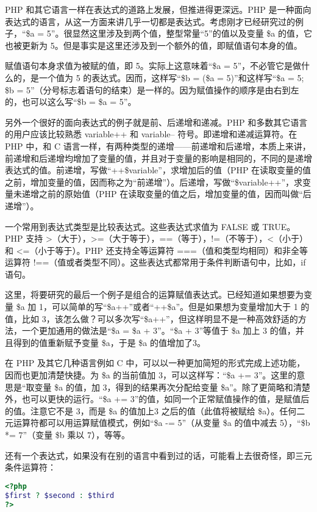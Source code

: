 PHP 和其它语言一样在表达式的道路上发展，但推进得更深远。PHP 是一种面向表达式的语言，从这一方面来讲几乎一切都是表达式。考虑刚才已经研究过的例子，“\$a = 5”。很显然这里涉及到两个值，整型常量“5”的值以及变量 \$a 的值，它也被更新为 5。但是事实是这里还涉及到一个额外的值，即赋值语句本身的值。

赋值语句本身求值为被赋的值，即 5。实际上这意味着“\$a = 5”，不必管它是做什么的，是一个值为 5 的表达式。因而，这样写“\$b = (\$a = 5)”和这样写“\$a = 5; \$b = 5”（分号标志着语句的结束）是一样的。因为赋值操作的顺序是由右到左的，也可以这么写“\$b = \$a = 5”。

另外一个很好的面向表达式的例子就是前、后递增和递减。PHP 和多数其它语言的用户应该比较熟悉 variable++ 和 variable-- 符号。即递增和递减运算符。在 PHP 中，和 C 语言一样，有两种类型的递增——前递增和后递增，本质上来讲，前递增和后递增均增加了变量的值，并且对于变量的影响是相同的，不同的是递增表达式的值。前递增，写做“++\$variable”，求增加后的值（PHP 在读取变量的值之前，增加变量的值，因而称之为“前递增”）。后递增，写做“\$variable++”，求变量未递增之前的原始值（PHP 在读取变量的值之后，增加变量的值，因而叫做“后递增”）。

一个常用到表达式类型是比较表达式。这些表达式求值为 FALSE 或 TRUE。PHP 支持 >（大于），>\/=（大于等于），=\/=（等于），!\/=（不等于），<（小于）和 <\/=（小于等于）。PHP 还支持全等运算符 =\/=\/=（值和类型均相同）和非全等运算符 !\/=\/=（值或者类型不同）。这些表达式都常用于条件判断语句中，比如，if 语句。

这里，将要研究的最后一个例子是组合的运算赋值表达式。已经知道如果想要为变量 \$a 加 1，可以简单的写“\$a++”或者“++\$a”。但是如果想为变量增加大于 1 的值，比如 3，该怎么做？可以多次写“\$a++”，但这样明显不是一种高效舒适的方法，一个更加通用的做法是“\$a = \$a + 3”。“\$a + 3”等值于 \$a 加上 3 的值，并且得到的值重新赋予变量 \$a，于是 \$a 的值增加了3。

在 PHP 及其它几种语言例如 C 中，可以以一种更加简短的形式完成上述功能，因而也更加清楚快捷。为 \$a 的当前值加 3，可以这样写：“\$a += 3”。这里的意思是“取变量 \$a 的值，加 3，得到的结果再次分配给变量 \$a”。除了更简略和清楚外，也可以更快的运行。“\$a += 3”的值，如同一个正常赋值操作的值，是赋值后的值。注意它不是 3，而是 \$a 的值加上3 之后的值（此值将被赋给 \$a）。任何二元运算符都可以用运算赋值模式，例如“\$a -= 5”（从变量 \$a 的值中减去 5），“\$b *= 7”（变量 \$b 乘以 7），等等。

还有一个表达式，如果没有在别的语言中看到过的话，可能看上去很奇怪，即三元条件运算符：


\begin{lstlisting}[language=PHP]
<?php
$first ? $second : $third
?>
\end{lstlisting}

